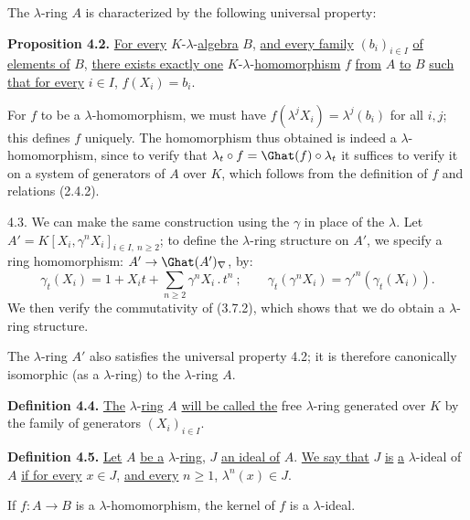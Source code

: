 %
The \(\lambda\)-ring \(A\) is characterized by the following universal property:

\textbf{Proposition 4.2.} \uline{For every} \(K\)-\(\lambda\)-\uline{algebra} \(B\), \uline{and every family} \((b_i)_{i\in I}\) \uline{of elements of} \(B\), \uline{there exists exactly one} \(K\)-\(\lambda\)-\uline{homomorphism} \(f\) \uline{from} \(A\) \uline{to} \(B\) \uline{such that for every} \(i\in I\), \(f(X_i)=b_i\).

For \(f\) to be a \(\lambda\)-homomorphism, we must have \(f(\lambda^j X_i)=\lambda^j(b_i)\) for all \(i,j\); this defines \(f\) uniquely. The homomorphism thus obtained is indeed a \(\lambda\)-homomorphism, since to verify that \(\lambda_t\circ f=\Ghat(f)\circ\lambda_t\) it suffices to verify it on a system of generators of \(A\) over \(K\), which follows from the definition of \(f\) and relations (2.4.2).

4.3. We can make the same construction using the \(\gamma\) in place of the \(\lambda\). Let \(A'=K[X_i,\gamma^n X_i]_{i\in I,\ n\ge2}\); to define the \(\lambda\)-ring structure on \(A'\), we specify a ring homomorphism: \(A'\to\Ghat(A')_\nabla\), by:
\begin{equation}\tag{4.3.1}
  \gamma_t(X_i)=1+X_it+\sum_{n\ge2}\gamma^n X_i\mathbin{.}t^n~;
  \qquad
  \gamma_t(\gamma^n X_i)=\gamma'^n(\gamma_t(X_i)).
\end{equation}
We then verify the commutativity of (3.7.2), which shows that we do obtain a \(\lambda\)-ring structure.

The \(\lambda\)-ring \(A'\) also satisfies the universal property 4.2; it is therefore canonically isomorphic (as a \(\lambda\)-ring) to the \(\lambda\)-ring \(A\).

\textbf{Definition 4.4.} \uline{The} \(\lambda\)-\uline{ring} \(A\) \uline{will be called the} free \(\lambda\)-ring generated over \(K\) by the family of generators \((X_i)_{i\in I}\).

\textbf{Definition 4.5.} \uline{Let} \(A\) \uline{be a} \(\lambda\)-\uline{ring}, \(J\) \uline{an ideal of} \(A\). \uline{We say that} \(J\) \uline{is} \uline{a} \(\lambda\)-ideal of \(A\) \uline{if for every} \(x\in J\), \uline{and every} \(n\ge1\), \(\lambda^n(x)\in J\).

If \(f:A\to B\) is a \(\lambda\)-homomorphism, the kernel of \(f\) is a \(\lambda\)-ideal.

